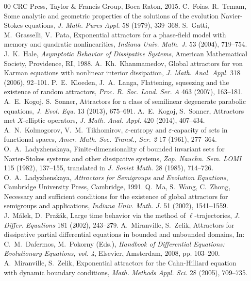 \documentclass[a4paper,12pt,reqno]{amsart}
\theoremstyle{plain}
\theoremstyle{definition}
\numberwithin{equation}{section}
\begin{document}
\begin{thebibliography}{00}
CRC Press, Taylor \& Francis Group, Boca Raton, 2015.
%
C.~Foias, R.~Temam, 
Some analytic and geometric properties of the solutions of the evolution Navier-Stokes equations, 
\textit{J. Math. Pures Appl.} 58 (1979), 339--368.
%
S.~Gatti, M.~Grasselli, V.~Pata, 
Exponential attractors for a phase-field model with memory and quadratic nonlinearities, 
\textit{Indiana Univ. Math. J.} 53 (2004), 719--754.
%
J.~K.~Hale,
\textit{Asymptotic Behavior of Dissipative Systems},
American Mathematical Society, Providence, RI, 1988. 
%
A.~Kh.~Khanmamedov,
Global attractors for von Karman equations with nonlinear interior dissipation,
\textit{J. Math. Anal. Appl.} 318 (2006), 92--101.
%
P.~E.~Kloeden, J.~A.~Langa,
Flattening, squeezing and the existence of random attractors,
\textit{Proc. R. Soc. Lond. Ser. A} 463 (2007), 163--181.
%
A.~E.~Kogoj, S.~Sonner,
Attractors for a class of semilinear degenerate parabolic equations, 
\textit{J. Evol. Equ.} 13 (2013), 675--691.
%
A.~E.~Kogoj, S.~Sonner,
Attractors met $X$-elliptic operators,
\textit{J. Math. Anal. Appl.} 420 (2014), 407--434.
%
A.~N.~Kolmogorov, V.~M.~Tikhomirov,
$\varepsilon$-entropy and $\varepsilon$-capacity of sets in functional spaces,
\textit{Amer. Math. Soc. Transl., Ser. 2} 17 (1961), 277--364.
%
O.~A.~Ladyzhenskaya,
Finite-dimensionality of bounded invariant sets for Navier-Stokes systems and other dissipative systems,
\textit{Zap. Nauchn. Sem. LOMI} 115 (1982), 137--155,
translated in \textit{J. Soviet Math.} 28 (1985), 714--726.
%
O.~A.~Ladyzhenskaya,
\textit{Attractors for Semigroups and Evolution Equations},
Cambridge University Press, Cambridge, 1991.
%
Q.~Ma, S.~Wang, C.~Zhong,
Necessary and sufficient conditions for the existence of global attractors for semigroups and applications,
\textit{Indiana Univ. Math. J.} 51 (2002), 1541--1559.
%
J.~M\'alek, D.~Pra\v{z}\'ak,
Large time behavior via the method of $\ell$-trajectories,
\textit{J. Differ. Equations} 181 (2002), 243--279.
%
A.~Miranville, S.~Zelik, 
Attractors for dissipative partial differential equations in bounded and unbounded domains, 
In: C.~M.~Dafermos, M.~Pokorny (Eds.), 
\textit{Handbook of Differential Equations: Evolutionary Equations, vol. 4}, Elsevier, Amsterdam, 2008, pp. 103--200.
%
A.~Miranville, S.~Zelik, 
Exponential attractors for the Cahn-Hilliard equation with dynamic boundary conditions, 
\textit{Math. Methods Appl. Sci.} 28 (2005), 709--735.

\end{thebibliography}
\end{document}
